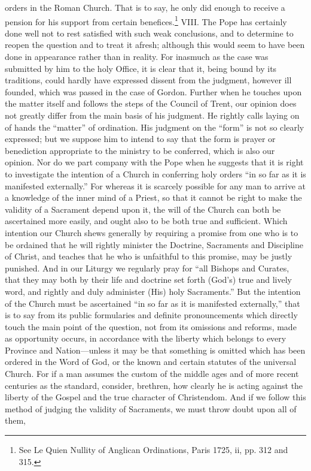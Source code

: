 orders in the Roman Church. That is to say, he only did enough to receive a pension for his support from certain benefices.\footnote{See Le Quien Nullity of Anglican Ordinations, Paris 1725, ii, pp. 312 and 315.} VIII. The Pope has certainly done well not to rest satisfied with such weak conclusions, and to determine to reopen the question and to treat it afresh; although this would seem to have been done in appearance rather than in reality. For inasmuch as the case was submitted by him to the holy Office, it is clear that it, being bound by its traditions, could hardly have expressed dissent from the judgment, however ill founded, which was passed in the case of Gordon. Further when he touches upon the matter itself and follows the steps of the Council of Trent, our opinion does not greatly differ from the main basis of his judgment. He rightly calls laying on of hands the “matter” of ordination. His judgment on the “form” is not so clearly expressed; but we suppose him to intend to say that the form is prayer or benediction appropriate to the ministry to be conferred, which is also our opinion. Nor do we part company with the Pope when he suggests that it is right to investigate the intention of a Church in conferring holy orders “in so far as it is manifested externally.” For whereas it is scarcely possible for any man to arrive at a knowledge of the inner mind of a Priest, so that it cannot be right to make the validity of a Sacrament depend upon it, the will of the Church can both be ascertained more easily, and ought also to be both true and sufficient. Which intention our Church shews generally by requiring a promise from one who is to be ordained that he will rightly minister the Doctrine, Sacraments and Discipline of Christ, and teaches that he who is unfaithful to this promise, may be justly punished. And in our Liturgy we regularly pray for “all Bishops and Curates, that they may both by their life and doctrine set forth (God’s) true and lively word, and rightly and duly administer (His) holy Sacraments.” But the intention of the Church must be ascertained “in so far as it is manifested externally,” that is to say from its public formularies and definite pronouncements which directly touch the main point of the question, not from its omissions and reforms, made as opportunity occurs, in accordance with the liberty which belongs to every Province and Nation—unless it may be that something is omitted which has been ordered in the Word of God, or the known and certain statutes of the universal Church. For if a man assumes the custom of the middle ages and of more recent centuries as the standard, consider, brethren, how clearly he is acting against the liberty of the Gospel and the true character of Christendom. And if we follow this method of judging the validity of Sacraments, we must throw doubt upon all of them,

